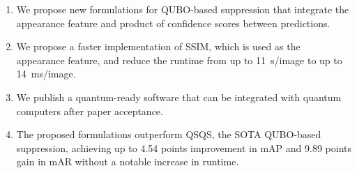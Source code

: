 \begin{enumerate}
    \item We propose new formulations for QUBO-based suppression that integrate the appearance feature and product of confidence scores between predictions.
    \item We propose a faster implementation of SSIM, which is used as the appearance feature, and reduce the runtime from up to 11~s/image to up to 14~ms/image.
    \item We publish a quantum-ready software that can be integrated with quantum computers after paper acceptance.%
    \item The proposed formulations outperform QSQS, the SOTA QUBO-based suppression, achieving up to 4.54 points improvement in mAP and 9.89 points gain in mAR without a notable increase in runtime.
\end{enumerate}





